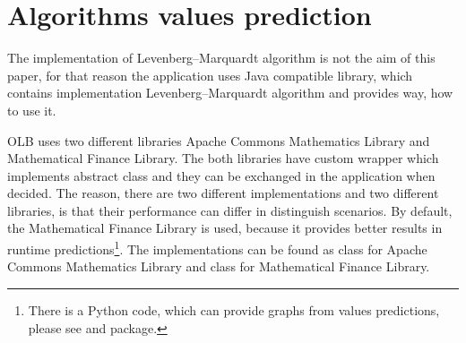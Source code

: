 \section{Algorithms values prediction}\label{sec:impl-algorithms-values-predictions}
The implementation of Levenberg–Marquardt algorithm is not the aim of this paper,
for that reason the application uses Java compatible library, 
which contains implementation Levenberg–Marquardt algorithm 
and provides way, 
how to use it.

OLB uses two different libraries Apache Commons Mathematics Library\cite{web:apacheCommonsMath}
and Mathematical Finance Library\cite{web:finmathLib}.
The both libraries have custom wrapper which implements  abstract class 
and they can be exchanged in the application when decided.
The reason, there are two different implementations and two different libraries,
is that their performance can differ in distinguish scenarios.
By default, the Mathematical Finance Library is used, 
because it provides better results in runtime predictions\footnote{
    There is a Python code, 
    which can provide graphs from values predictions, 
    please see  
    and  package.
}.
The implementations can be found as  class for Apache Commons Mathematics Library
and  class for Mathematical Finance Library.